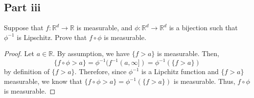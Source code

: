 \subsection{Part iii}

\begin{question}
   Suppose that $f: \mathbb{R}^d \rightarrow \mathbb{R}$ is measurable, and $\phi: \mathbb{R}^d \rightarrow \mathbb{R}^d$ is a bijection such that $\phi^{-1}$ is Lipschitz. Prove that $f \circ \phi$ is measurable.
\end{question}

\begin{answer}
    \begin{proof}
        Let $a \in \mathbb{R}$. By assumption, we have $\{f > a\}$ is measurable. Then,
        \begin{equation}
            \{f \circ \phi > a\} = \phi^{-1}(f^{-1}(a,\infty]) = \phi^{-1}(\{f > a\})
        \end{equation}
        by definition of $\{f > a\}$. Therefore, since $\phi^{-1}$ is a Lipchitz function and $\{f > a\}$ measurable, we know that $\{f \circ \phi > a\} = \phi^{-1}(\{f > a\})$ is measurable. Thus, $f \circ \phi$ is measurable.
    \end{proof}
\end{answer}